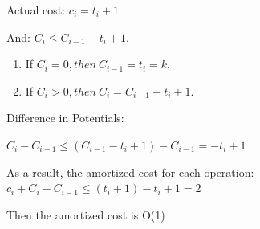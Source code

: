 \begin{homeworkProblem}
Actual cost: $c_i = t_i + 1$

And: $C_i \leq C_{i-1} - t_i + 1$. 
\begin{enumerate}
    \item If $C_i = 0, then \  C_{i-1} = t_i = k$.  
    \item If $C_i > 0, then \ C_i = C_{i-1} - t_i + 1$.  
\end{enumerate}

Difference in Potentials:

$C_i - C_{i-1} \leq (C_{i-1} - t_i + 1) - C_{i-1} = -t_i + 1$

As a result, the amortized cost for each operation: $c_i + C_i - C_{i-1} \leq (t_i + 1) - t_i + 1 = 2$

Then the amortized cost is O(1)

\end{homeworkProblem}



